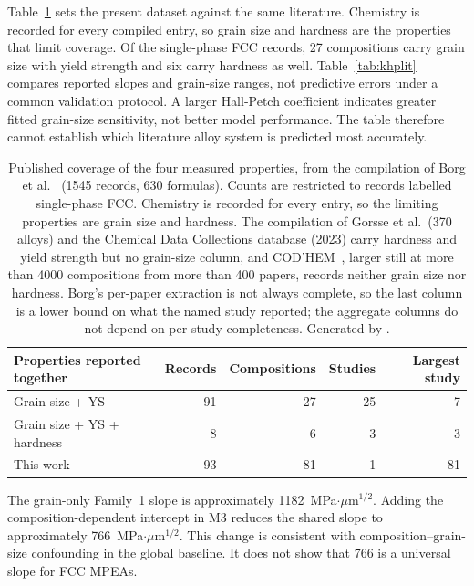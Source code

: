\documentclass[a4paper,11pt]{article}
\begin{document}
Table~\ref{tab:litcoverage} sets the present dataset against the same literature. Chemistry is recorded for every compiled entry, so grain size and hardness are the properties that limit coverage. Of the single-phase FCC records, 27 compositions carry grain size with yield strength and six carry hardness as well. Table~\ref{tab:khplit} compares reported slopes and grain-size ranges, not predictive errors under a common validation protocol. A larger Hall-Petch coefficient indicates greater fitted grain-size sensitivity, not better model performance. The table therefore cannot establish which literature alloy system is predicted most accurately.

\begin{table}[H]
\centering
\caption{Published coverage of the four measured properties, from the compilation of Borg et al.~\cite{Borg2020} (1545 records, 630 formulas). Counts are restricted to records labelled single-phase FCC. Chemistry is recorded for every entry, so the limiting properties are grain size and hardness. The compilation of Gorsse et al.\ (370 alloys) and the Chemical Data Collections database (2023) carry hardness and yield strength but no grain-size column, and COD'HEM~\cite{CODHEM2025}, larger still at more than 4000 compositions from more than 400 papers, records neither grain size nor hardness. Borg's per-paper extraction is not always complete, so the last column is a lower bound on what the named study reported; the aggregate columns do not depend on per-study completeness. Generated by \protect{}.}
\label{tab:litcoverage}
\small
\begin{tabular}{@{}lrrrr@{}}
\toprule
Properties reported together & Records & Compositions & Studies & Largest study \\
\midrule
Grain size + YS & 91 & 27 & 25 & 7 \\
Grain size + YS + hardness & 8 & 6 & 3 & 3 \\
\midrule
This work & 93 & 81 & 1 & 81 \\
\bottomrule
\end{tabular}
\end{table}

The grain-only Family~1 slope is approximately 1182~MPa$\cdot\mu$m$^{1/2}$. Adding the composition-dependent intercept in M3 reduces the shared slope to approximately 766~MPa$\cdot\mu$m$^{1/2}$. This change is consistent with composition--grain-size confounding in the global baseline. It does not show that 766 is a universal slope for FCC MPEAs.
\end{document}
